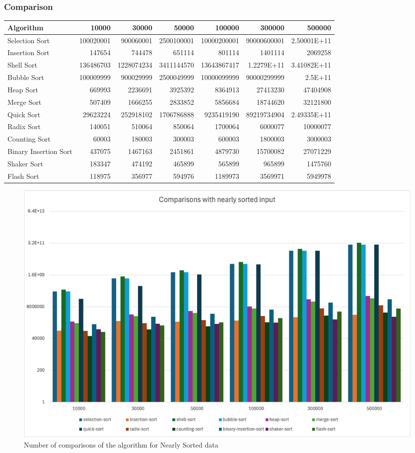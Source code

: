 \subsubsection{Comparison}
\begin{table}[h!]
\centering
\begin{tabular}{|l|r|r|r|r|r|r|}
\hline
\textbf{Algorithm} & \textbf{10000} & \textbf{30000} & \textbf{50000} & \textbf{100000} & \textbf{300000} & \textbf{500000} \\
\hline
Selection Sort & 100020001 & 900060001 & 2500100001 & 10000200001 & 90000600001 & 2.50001E+11 \\ \hline
Insertion Sort & 147654 & 744478 & 651114 & 801114 & 1401114 & 2069258 \\ \hline
Shell Sort & 136486703 & 1228074234 & 3411144570 & 13643867417 & 1.2279E+11 & 3.41082E+11 \\ \hline
Bubble Sort & 100009999 & 900029999 & 2500049999 & 10000099999 & 90000299999 & 2.5E+11 \\ \hline
Heap Sort & 669993 & 2236691 & 3925392 & 8364913 & 27413230 & 47404908 \\ \hline
Merge Sort & 507409 & 1666255 & 2833852 & 5856684 & 18744620 & 32121800 \\ \hline
Quick Sort & 29623224 & 252918102 & 1706786888 & 9235419190 & 89219734904 & 2.49335E+11 \\ \hline
Radix Sort & 140051 & 510064 & 850064 & 1700064 & 6000077 & 10000077 \\ \hline
Counting Sort & 60003 & 180003 & 300003 & 600003 & 1800003 & 3000003 \\ \hline
Binary Insertion Sort & 437075 & 1467163 & 2451861 & 4879730 & 15700082 & 27071229 \\ \hline
Shaker Sort & 183347 & 474192 & 465899 & 565899 & 965899 & 1475760 \\ \hline
Flash Sort & 118975 & 356977 & 594976 & 1189973 & 3569971 & 5949978 \\
\hline
\end{tabular}
\label{table:nearly_sorted_number_of_comparisons}
\end{table}

\begin{figure}[h]
    \centering
    \includegraphics[scale=.65]{Figures/Visualization/Nearly_compare.png}
    \caption{Number of comparisons of the algorithm for Nearly Sorted data}
    \label{fig:enter-label}
\end{figure}

